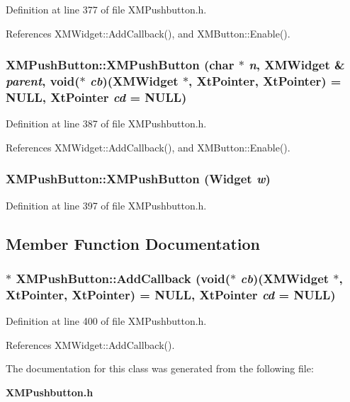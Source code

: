 Definition at line 377 of file XMPushbutton.h.

References XMWidget::Add\-Callback(), and XMButton::Enable().
\subsubsection{\setlength{\rightskip}{0pt plus 5cm}XMPush\-Button::XMPush\-Button (char $\ast$ {\em n}, {\bf XMWidget} \& {\em parent}, void($\ast$ {\em cb})({\bf XMWidget} $\ast$, Xt\-Pointer, Xt\-Pointer) = NULL, Xt\-Pointer {\em cd} = NULL)\hspace{0.3cm}{\tt  [inline]}}\label{classXMPushButton_a1}




Definition at line 387 of file XMPushbutton.h.

References XMWidget::Add\-Callback(), and XMButton::Enable().
\subsubsection{\setlength{\rightskip}{0pt plus 5cm}XMPush\-Button::XMPush\-Button (Widget {\em w})\hspace{0.3cm}{\tt  [inline]}}\label{classXMPushButton_a2}




Definition at line 397 of file XMPushbutton.h.

\subsection{Member Function Documentation}
\subsubsection{$\ast$ XMPush\-Button::Add\-Callback (void($\ast$ {\em cb})({\bf XMWidget} $\ast$, Xt\-Pointer, Xt\-Pointer) = NULL, Xt\-Pointer {\em cd} = NULL)\hspace{0.3cm}{\tt  [inline]}}\label{classXMPushButton_a3}




Definition at line 400 of file XMPushbutton.h.

References XMWidget::Add\-Callback().

The documentation for this class was generated from the following file:\begin{CompactItemize}
\item 
{\bf XMPushbutton.h}\end{CompactItemize}
